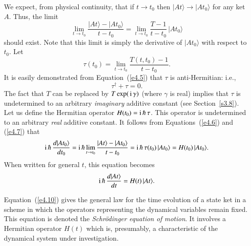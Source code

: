 We expect, from physical continuity, that if $t\rightarrow t_0$ then
$|At\rangle\rightarrow |A t_0\rangle$ for any ket $A$. Thus, the
limit
\begin{equation}\label{e4.6}
\lim_{t\rightarrow t_0} \frac{|At\rangle - |At_0\rangle}{t-t_0} =
\lim_{t\rightarrow t_0}\frac{T-1}{t-t_0}\,|At_0\rangle
\end{equation}
should exist. Note that this limit is simply the derivative of
$|A t_0\rangle$ with respect to $t_0$. Let 
\begin{equation}\label{e4.7}
\tau(t_0) = \lim_{t\rightarrow t_0}\frac{T(t, t_0)-1}{t-t_0}.
\end{equation}
It is easily demonstrated from Equation~(\ref{e4.5}) that $\tau$ is anti-Hermitian:
{\rm i.e.},
\begin{equation}
\tau^{\dag} + \tau = 0.
\end{equation}
The fact that $T$ can be replaced by $T\exp(\,{\rm i}\,\gamma)$ (where $\gamma$ is
real) implies that $\tau$ is undetermined to an arbitrary {\em imaginary}\/ additive
constant (see Section~\ref{s3.8}). Let us
define the Hermitian operator $H(t_0)= {\rm i}\,\hbar \,\tau$. This operator is
undetermined to an arbitrary {\em  real} additive constant. It follows from Equations~(\ref{e4.6})
and (\ref{e4.7}) that
\begin{equation}
{\rm i}\,\hbar \,\frac{d|At_0\rangle}{dt_0} = {\rm i}\,\hbar\lim_{t\rightarrow t_0}
\frac{ |At\rangle - |At_0\rangle}{t-t_0} = {\rm i}\,\hbar\,\tau(t_0)\,|At_0\rangle
= H(t_0) \,|At_0\rangle.
\end{equation}
When written for general $t$, this equation becomes
\begin{equation}\label{e4.10}
{\rm i}\,\hbar\, \frac{d|At\rangle}{dt} = H(t)\,|At\rangle.
\end{equation}

Equation~(\ref{e4.10}) gives the general law for the time evolution  of a state
ket in a scheme in which the operators representing the dynamical variables remain
fixed. This equation is denoted  the {\em Schr\"{o}dinger equation of motion}. 
It involves a Hermitian operator $H(t)$ which is, presumably, a characteristic
of the dynamical system under investigation. 

